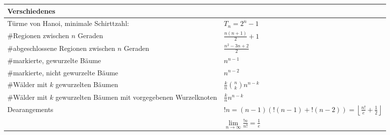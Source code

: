 \begin{tabularx}{\linewidth}{|ll|}
	\hline
	\multicolumn{2}{|C|}{Verschiedenes} \\
	\hline
	Türme von Hanoi, minimale Schirttzahl: &
	$T_n = 2^n - 1$ \\

	\#Regionen zwischen $n$ Geraden	&
	$\frac{n\left(n + 1\right)}{2} + 1$ \\

	\#abgeschlossene Regionen zwischen $n$ Geraden &
	$\frac{n^2 - 3n + 2}{2}$ \\

	\#markierte, gewurzelte Bäume	&
	$n^{n-1}$ \\

	\#markierte, nicht gewurzelte Bäume	&
	$n^{n-2}$ \\

	\#Wälder mit $k$ gewurzelten Bäumen	&
	$\frac{k}{n}\binom{n}{k}n^{n-k}$ \\

	\#Wälder mit $k$ gewurzelten Bäumen mit vorgegebenen Wurzelknoten&
	$\frac{k}{n}n^{n-k}$ \\

	Dearangements &
	$!n = (n - 1)(!(n - 1) + !(n - 2)) = \left\lfloor\frac{n!}{e} + \frac{1}{2}\right\rfloor$ \\
	&
	$\lim\limits_{n \to \infty} \frac{!n}{n!} = \frac{1}{e}$ \\
	\hline
\end{tabularx}

